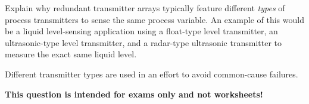 

Explain why redundant transmitter arrays typically feature different {\it types} of process transmitters to sense the same process variable.  An example of this would be a liquid level-sensing application using a float-type level transmitter, an ultrasonic-type level transmitter, and a radar-type ultrasonic transmitter to measure the exact same liquid level.







Different transmitter types are used in an effort to avoid common-cause failures.







{\bf This question is intended for exams only and not worksheets!}




